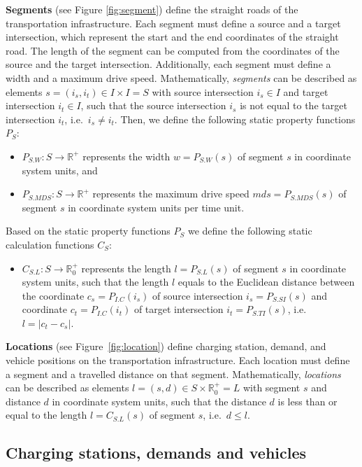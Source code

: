 \documentclass[graybox]{svmult}
\begin{document}
\noindent \textbf{Segments} (see Figure \ref{fig:segment}) define the straight roads of the transportation infrastructure.
Each segment must define a source and a target intersection, which represent the start and the end coordinates of the straight road.
The length of the segment can be computed from the coordinates of the source and the target intersection.
Additionally, each segment must define a width and a maximum drive speed.
Mathematically, \textit{segments} can be described as elements $s = (i_s, i_t) \in I \times I = S$ with source intersection $i_s \in I$ and target intersection $i_t \in I$, such that the source intersection $i_s$ is not equal to the target intersection $i_t$, i.e.\ $i_s \neq i_t$.
Then, we define the following static property functions $P_{S}$:
\begin{itemize}
	\item $P_{S.W}: S \rightarrow \mathbb{R}^+$ represents the width $w = P_{S.W}(s)$ of segment $s$ in coordinate system units, and
	\item $P_{S.MDS}: S \rightarrow \mathbb{R}^+$ represents the maximum drive speed $mds = P_{S.MDS}(s)$ of segment $s$ in coordinate system units per time unit.
\end{itemize}
Based on the static property functions $P_S$ we define the following static calculation functions $C_{S}$:
\begin{itemize}
	\item $C_{S.L}: S \rightarrow \mathbb{R}_0^+$ represents the length $l = P_{S.L}(s)$ of segment $s$ in coordinate system units, such that the length $l$ equals to the Euclidean distance between the coordinate $c_s = P_{I.C}(i_s)$ of source intersection $i_s = P_{S.SI}(s)$ and coordinate $c_t = P_{I.C}(i_t)$ of target intersection $i_t = P_{S.TI}(s)$, i.e.\ $l = |c_t - c_s|$.
\end{itemize}

\noindent \textbf{Locations} (see Figure~\ref{fig:location}) define charging station, demand, and vehicle positions on the transportation infrastructure.
Each location must define a segment and a travelled distance on that segment.
Mathematically, \textit{locations} can be described as elements $l = (s, d) \in S \times \mathbb{R}_0^+ = L$ with segment $s$ and distance $d$ in coordinate system units, such that the distance $d$ is less than or equal to the length $l = C_{S.L}(s)$ of segment $s$, i.e.\ $d \leq l$.

\subsection{Charging stations, demands and vehicles}
\label{sec:chargingstations-demands-vehicles}
\end{document}
